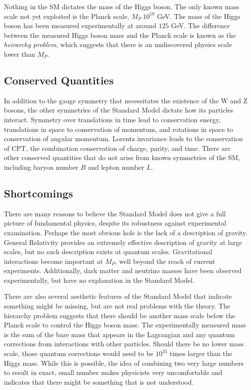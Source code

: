 Nothing in the \ac{SM} dictates the mass of the Higgs boson. The only known mass scale not yet exploited is the Planck scale, $M_P ~{} 10^{19}$ GeV. The mass of the Higgs boson has been measured experimentally at around $125$ GeV. The difference between the measured Higgs boson mass and the Planck scale is known as the \emph{heirarchy problem}, which suggests that there is an undiscovered physics scale lower than $M_P$. 


\subsection{Conserved Quantities}

In addition to the gauge symmetry that necessitates the existence of the W and Z bosons, the other symmetries of the Standard Model dictate how its particles interact. Symmetry over translations in time lead to conservation energy, translations in space to conservation of momentum, and rotations in space to conservation of angular momentum. Lorentz invariance leads to the conservation of CPT, the combination conservation of charge, parity, and time. There are other conserved quantities that do not arise from known symmetries of the \ac{SM}, including baryon number $B$ and lepton number $L$. 


\subsection{Shortcomings}
There are many reasons to believe the Standard Model does not give a full picture of fundamental physics, despite its robustness against experimental examination. Perhaps the most obvious hole is the lack of a description of gravity. General Relativity provides an extremely effective description of gravity at large scales, but no such description exists at quantum scales. Gravitational interactions become important at $M_P$, well beyond the reach of current experiments. Additionally, dark matter and neutrino masses have been observed experimentally, but have no explanation in the Standard Model. 

There are also several aesthetic features of the Standard Model that indicate something might be missing, but are not real problems with the theory. The hierarchy problem suggests that there should be another mass scale below the Planck scale to control the Higgs boson mass. The experimentally measured mass is the sum of the bare mass that appears in the Lagrangian and any quantum corrections from interactions with other particles. Should there be no lower mass scale, those quantum corrections would need to be $10^{35}$ times larger than the Higgs mass. While this is possible, the idea of combining two very large numbers to result in exact, small number makes physicists very uncomfortable and indicates that there might be something that is not understood.

